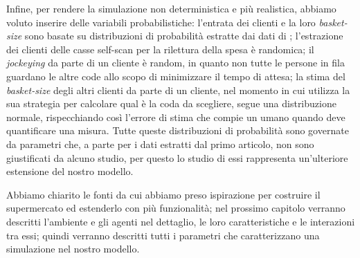 Infine, per rendere la simulazione non deterministica e più realistica, abbiamo voluto inserire delle variabili probabilistiche: l'entrata dei clienti e la loro \textit{basket-size} sono basate su distribuzioni di probabilità estratte dai dati di \cite{article1}; l'estrazione dei clienti delle casse self-scan per la rilettura della spesa è randomica; il \textit{jockeying} da parte di un cliente è random, in quanto non tutte le persone in fila guardano le altre code allo scopo di minimizzare il tempo di attesa; la stima del \textit{basket-size} degli altri clienti da parte di un cliente, nel momento in cui utilizza la sua strategia per calcolare qual è la coda da scegliere, segue una distribuzione normale, rispecchiando così l'errore di stima che compie un umano quando deve quantificare una misura. Tutte queste distribuzioni di probabilità sono governate da parametri che, a parte per i dati estratti dal primo articolo, non sono giustificati da alcuno studio, per questo lo studio di essi rappresenta un'ulteriore estensione del nostro modello.

\vspace*{1\baselineskip}

Abbiamo chiarito le fonti da cui abbiamo preso ispirazione per costruire il supermercato ed estenderlo con più funzionalità; nel prossimo capitolo verranno descritti l'ambiente e gli agenti nel dettaglio, le loro caratteristiche e le interazioni tra essi; quindi verranno descritti tutti i parametri che caratterizzano una simulazione nel nostro modello.